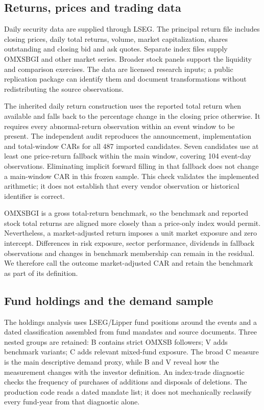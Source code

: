 \subsection{Returns, prices and trading data}

Daily security data are supplied through LSEG. The principal return file includes closing prices, daily total returns, volume, market capitalization, shares outstanding and closing bid and ask quotes. Separate index files supply OMXSBGI and other market series. Broader stock panels support the liquidity and comparison exercises. The data are licensed research inputs; a public replication package can identify them and document transformations without redistributing the source observations.

The inherited daily return construction uses the reported total return when available and falls back to the percentage change in the closing price otherwise. It requires every abnormal-return observation within an event window to be present. The independent audit reproduces the announcement, implementation and total-window CARs for all 487 imported candidates. Seven candidates use at least one price-return fallback within the main window, covering 104 event-day observations. Eliminating implicit forward filling in that fallback does not change a main-window CAR in this frozen sample. This check validates the implemented arithmetic; it does not establish that every vendor observation or historical identifier is correct.

OMXSBGI is a gross total-return benchmark, so the benchmark and reported stock total returns are aligned more closely than a price-only index would permit. Nevertheless, a market-adjusted return imposes a unit market exposure and zero intercept. Differences in risk exposure, sector performance, dividends in fallback observations and changes in benchmark membership can remain in the residual. We therefore call the outcome market-adjusted CAR and retain the benchmark as part of its definition.

\subsection{Fund holdings and the demand sample}

The holdings analysis uses LSEG/Lipper fund positions around the events and a dated classification assembled from fund mandates and source documents. Three nested groups are retained: B contains strict OMXSB followers; V adds benchmark variants; C adds relevant mixed-fund exposure. The broad C measure is the main descriptive demand proxy, while B and V reveal how the measurement changes with the investor definition. An index-trade diagnostic checks the frequency of purchases of additions and disposals of deletions. The production code reads a dated mandate list; it does not mechanically reclassify every fund-year from that diagnostic alone.

